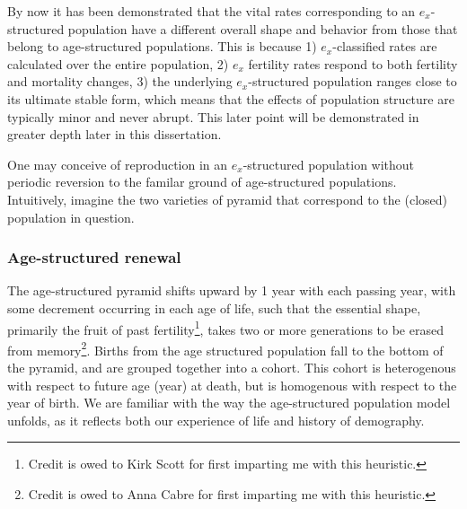 
By now it has been demonstrated that the vital rates corresponding to an
$e_x$-structured population have a different overall shape and behavior from
those that belong to age-structured populations. This is because 1) $e_x$-classified rates
are calculated over the entire population, 2) $e_x$ fertility rates respond to
both fertility and mortality changes, 3) the underlying $e_x$-structured
population ranges close to its ultimate stable form, which means that
the effects of population structure are typically minor and never abrupt. This
later point will be demonstrated in greater depth later in this dissertation.

One may conceive of reproduction in an $e_x$-structured population without
periodic reversion to the familar ground of age-structured populations.
Intuitively, imagine the two varieties of pyramid that correspond to the
(closed) population in question. 

\subsubsection{Age-structured renewal}
The age-structured pyramid shifts upward by 1 year with
each passing year, with some decrement occurring in each age of life, such that
the essential shape, primarily the fruit of past fertility\footnote{Credit is
owed to Kirk Scott for first imparting me with this heuristic.}, takes two or
more generations to be erased from memory\footnote{Credit is
owed to Anna Cabre for first imparting me with this heuristic.}. Births from the
age structured population fall to the bottom of the pyramid, and are grouped 
together into a cohort. This cohort is heterogenous with respect to future 
age (year) at death, but is
homogenous with respect to the year of birth. We are familiar with
the way the age-structured population model unfolds, as it
reflects both our experience of life and history of demography.

